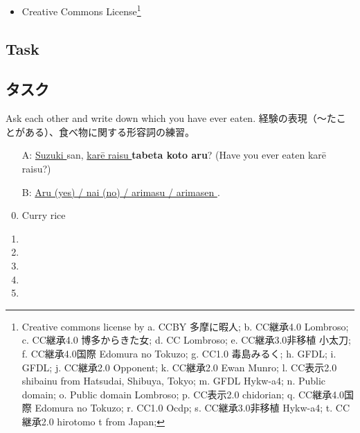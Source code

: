 \documentclass[uplatex,dvipdfmx,b5paper,english,10pt]{jsbook}
\begin{document}
\begin{toianswer}
\begin{itemize}
 \item Creative Commons License\footnote{Creative commons license by
       a. CCBY 多摩に暇人;
       b. CC継承4.0 Lombroso;
       c. CC継承4.0 博多からきた女;
       d. CC Lombroso;
       e. CC継承3.0非移植 小太刀;
       f. CC継承4.0国際 Edomura no Tokuzo;
       g. CC1.0 毒島みるく;
       h. GFDL;
       i. GFDL;
       j. CC継承2.0 Opponent;
       k. CC継承2.0 Ewan Munro;
       l. CC表示2.0 shibainu from Hatsudai, Shibuya, Tokyo;
       m. GFDL Hykw-a4; %
       n. Public domain;
       o. Public domain Lombroso;
       p. CC表示2.0 chidorian;
       q. CC継承4.0国際 Edomura no Tokuzo;
       r. CC1.0 Ocdp;
       s. CC継承3.0非移植 Hykw-a4;
       t. CC継承2.0 hirotomo t from Japan; %
     }
\end{itemize}
\end{toianswer}

\ifEnglish
\subsection{Task}
\else
\subsection{タスク}
\fi

\begin{toiquestion}
\ifEnglish
Ask each other and write down which you have ever eaten.
\else
経験の表現（〜たことがある）、食べ物に関する形容詞の練習。
\fi
\end{toiquestion}

\begin{itemize}
 \item[A:] \underline{ Suzuki } san, \underline{ kar\=e raisu } {\bfseries tabeta koto aru}? (Have you ever eaten kar\=e raisu?)
 \item[B:] \underline{ Aru (yes) / nai (no) / arimasu / arimasen }.
\end{itemize}

\begin{multicols}{2}
 \begin{enumerate}
 \setcounter{enumi}{-1}
  \item Curry rice \hrulefill
  \item \hrulefill
  \item \hrulefill
  \item \hrulefill
  \item \hrulefill
  \item \hrulefill
 \end{enumerate}
\end{multicols}
\end{document}
